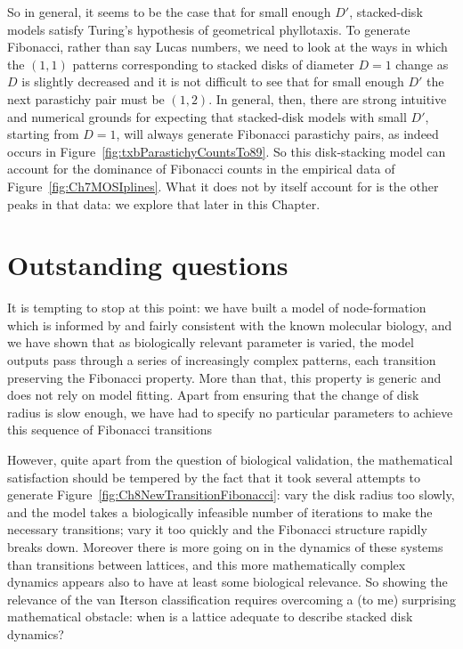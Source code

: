 \clearpage
{}
So in general, it seems to be the case that for small enough $D'$, stacked-disk models satisfy Turing's hypothesis of geometrical phyllotaxis. To generate Fibonacci, rather than say Lucas numbers, we need to look at the ways in which the $(1,1)$ patterns corresponding to stacked disks of diameter $D=1$ change as $D$ is slightly decreased and it is not difficult to see that for small enough $D'$ the next parastichy pair must be $(1,2)$. In general, then, there are strong intuitive and numerical grounds for expecting that stacked-disk models with small $D'$, starting from $D=1$, will always generate Fibonacci parastichy pairs, as indeed occurs in Figure~\ref{fig:txbParastichyCountsTo89}.
So this disk-stacking model can account for the dominance of Fibonacci counts in the empirical data of Figure~\ref{fig:Ch7MOSIplines}.  What it does not by itself account for is the other peaks in that data: we explore that later in this Chapter.

\clearpage
\section{Outstanding questions} 


It is tempting to stop at this point: we have built a model of node-formation which is informed by and fairly consistent with the known molecular biology, and we have shown that as biologically relevant parameter is varied, the model outputs pass through a series of increasingly complex patterns, each transition preserving the Fibonacci property. More than that, this property is generic and does not rely on model fitting. Apart from ensuring that the change of disk radius is slow enough, we have had to specify no particular parameters to achieve this sequence of Fibonacci transitions

However, quite apart from the question of biological validation, the mathematical satisfaction should be tempered by the fact that it took several attempts to generate Figure~\ref{fig:Ch8NewTransitionFibonacci}: vary the disk radius too slowly, and the model takes a biologically infeasible number of iterations to make the necessary transitions; vary it too quickly and the Fibonacci structure rapidly breaks down. 
Moreover there is more going on in the dynamics of these systems than transitions between lattices, and this more mathematically complex dynamics appears also to have at least some biological relevance.  So showing the   relevance of the van Iterson classification requires overcoming  a (to me) surprising mathematical obstacle: when is a lattice  adequate to describe stacked disk dynamics?

